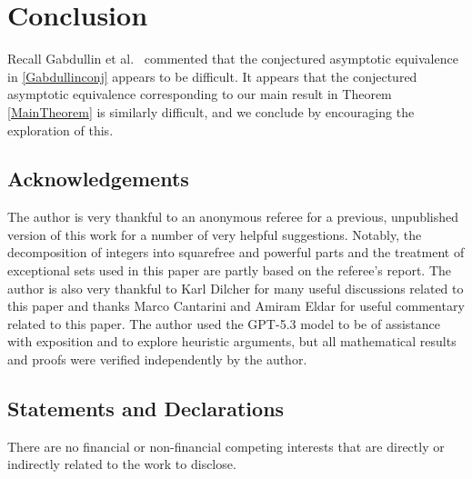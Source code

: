 \documentclass[12pt]{article}
\begin{document}
\section{Conclusion}
 Recall Gabdullin et al.\ \cite{GabdullinKonyaginIudelevich2023} commented that the conjectured asymptotic equivalence in 
 \eqref{Gabdullinconj} appears to be difficult. It appears that the conjectured asymptotic equivalence corresponding to our main result 
 in Theorem \ref{MainTheorem} is similarly difficult, and we conclude by encouraging the exploration of this. 

\subsection*{Acknowledgements}
 The author is very thankful to an anonymous referee for a previous, unpublished version of this work for a number of very helpful 
 suggestions. Notably, the decomposition of integers into squarefree and powerful parts and the treatment of exceptional sets used in 
 this paper are partly based on the referee’s report. The author is also very thankful to Karl Dilcher for many useful discussions related to 
 this paper and thanks Marco Cantarini and Amiram Eldar for useful commentary related to this paper. 
 The author used the GPT-5.3 model to be of assistance with exposition and to explore heuristic arguments, but 
 all mathematical results and proofs were verified independently by the author.

\subsection*{Statements and Declarations}
 There are no financial or non-financial competing interests that are directly or indirectly related to the work 
 to disclose. 

 

\end{document}

